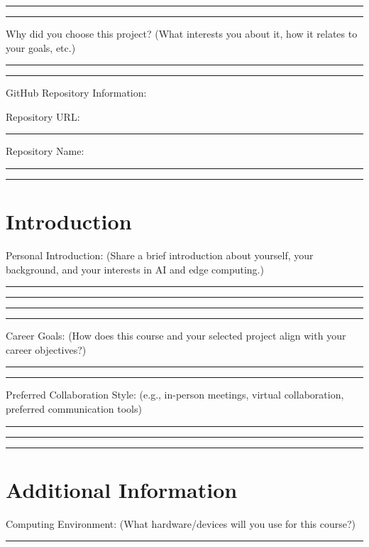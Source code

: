 \documentclass[11pt]{article}
\begin{document}
	\noindent\rule{\textwidth}{0.4pt}
	
	\noindent\rule{\textwidth}{0.4pt}
	
	\noindent Why did you choose this project? (What interests you about it, how it relates to your goals, etc.)
	
	\noindent\rule{\textwidth}{0.4pt}
	
	\noindent\rule{\textwidth}{0.4pt}
	
	\noindent GitHub Repository Information:
	
	\noindent Repository URL: \rule{10cm}{0.4pt}
	
	\noindent Repository Name: \rule{10cm}{0.4pt}
	
	\noindent\rule{\textwidth}{0.4pt}
	
	\section{Introduction}
	
	\noindent Personal Introduction: (Share a brief introduction about yourself, your background, and your interests in AI and edge computing.)
	
	\noindent\rule{\textwidth}{0.4pt}
	
	\noindent\rule{\textwidth}{0.4pt}
	
	\noindent\rule{\textwidth}{0.4pt}
	
	\noindent\rule{\textwidth}{0.4pt}
	
	\noindent Career Goals: (How does this course and your selected project align with your career objectives?)
	
	\noindent\rule{\textwidth}{0.4pt}
	
	\noindent\rule{\textwidth}{0.4pt}
	
	\noindent Preferred Collaboration Style: (e.g., in-person meetings, virtual collaboration, preferred communication tools)
	
	\noindent\rule{\textwidth}{0.4pt}
	
	\noindent\rule{\textwidth}{0.4pt}
	
	\noindent\rule{\textwidth}{0.4pt}
	
	\section{Additional Information}
	
	\noindent Computing Environment: (What hardware/devices will you use for this course?)
	
	\noindent\rule{\textwidth}{0.4pt}
	
\end{document}
